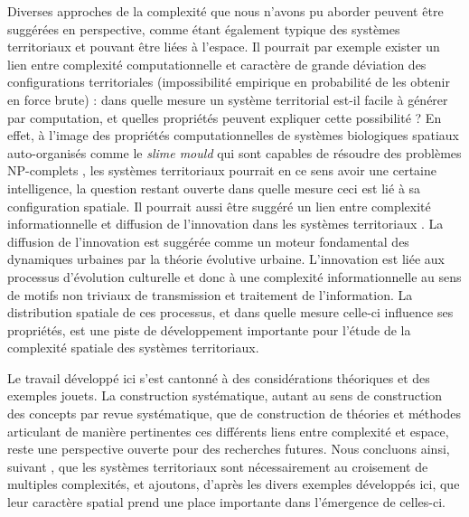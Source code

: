 \documentclass[11pt]{article}
\begin{document}
Diverses approches de la complexité que nous n'avons pu aborder peuvent être suggérées en perspective, comme étant également typique des systèmes territoriaux et pouvant être liées à l'espace. Il pourrait par exemple exister un lien entre complexité computationnelle et caractère de grande déviation des configurations territoriales (impossibilité empirique en probabilité de les obtenir en force brute) : dans quelle mesure un système territorial est-il facile à générer par computation, et quelles propriétés peuvent expliquer cette possibilité ? En effet, à l'image des propriétés computationnelles de systèmes biologiques spatiaux auto-organisés comme le \emph{slime mould} qui sont capables de résoudre des problèmes NP-complets \citep{zhu2013amoeba}, les systèmes territoriaux pourrait en ce sens avoir une certaine intelligence, la question restant ouverte dans quelle mesure ceci est lié à sa configuration spatiale. Il pourrait aussi être suggéré un lien entre complexité informationnelle et diffusion de l'innovation dans les systèmes territoriaux \citep{favaro2011gibrat}. La diffusion de l'innovation est suggérée comme un moteur fondamental des dynamiques urbaines par la théorie évolutive urbaine. L'innovation est liée aux processus d'évolution culturelle \citep{Mesoudi25072017} et donc à une complexité informationnelle au sens de motifs non triviaux de transmission et traitement de l'information. La distribution spatiale de ces processus, et dans quelle mesure celle-ci influence ses propriétés, est une piste de développement importante pour l'étude de la complexité spatiale des systèmes territoriaux.


Le travail développé ici s'est cantonné à des considérations théoriques et des exemples jouets. La construction systématique, autant au sens de construction des concepts par revue systématique, que de construction de théories et méthodes articulant de manière pertinentes ces différents liens entre complexité et espace, reste une perspective ouverte pour des recherches futures. Nous concluons ainsi, suivant \cite{raimbault2017complexity}, que les systèmes territoriaux sont nécessairement au croisement de multiples complexités, et ajoutons, d'après les divers exemples développés ici, que leur caractère spatial prend une place importante dans l'émergence de celles-ci.

\end{document}
